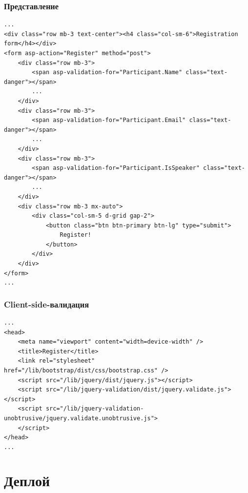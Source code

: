 \documentclass{../../slides-style}
\begin{document}
    \begin{frame}[fragile]
        \frametitle{Представление}
        \begin{ssmall}
            \begin{verbatim}
...
<div class="row mb-3 text-center"><h4 class="col-sm-6">Registration form</h4></div>
<form asp-action="Register" method="post">
    <div class="row mb-3">
        <span asp-validation-for="Participant.Name" class="text-danger"></span>
        ...
    </div>
    <div class="row mb-3">
        <span asp-validation-for="Participant.Email" class="text-danger"></span>
        ...
    </div>
    <div class="row mb-3">
        <span asp-validation-for="Participant.IsSpeaker" class="text-danger"></span>
        ...
    </div>
    <div class="row mb-3 mx-auto">
        <div class="col-sm-5 d-grid gap-2">
            <button class="btn btn-primary btn-lg" type="submit">
                Register!
            </button>
        </div>
    </div>
</form>
...
            \end{verbatim}
        \end{ssmall}
    \end{frame}

    \begin{frame}[fragile]
        \frametitle{Client-side-валидация}
        \begin{scriptsize}
            \begin{verbatim}
...
<head>
    <meta name="viewport" content="width=device-width" />
    <title>Register</title>
    <link rel="stylesheet" href="/lib/bootstrap/dist/css/bootstrap.css" />
    <script src="/lib/jquery/dist/jquery.js"></script>
    <script src="/lib/jquery-validation/dist/jquery.validate.js"></script>
    <script src="/lib/jquery-validation-unobtrusive/jquery.validate.unobtrusive.js">
    </script>
</head>
...
            \end{verbatim}
        \end{scriptsize}
    \end{frame}

    \section{Деплой}
\end{document}

